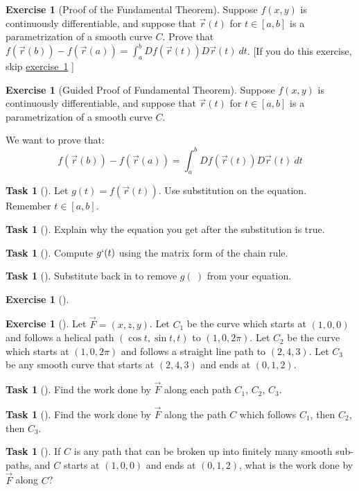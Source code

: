 \documentclass[10pt,]{book}
\theoremstyle{plain}
\theoremstyle{definition}
\theoremstyle{definition}
\theoremstyle{definition}
\theoremstyle{definition}
\newtheorem{exploration}[project]{Exercise}
\newtheorem{task}[project]{Task}
\theoremstyle{definition}
\numberwithin{equation}{section}
\begin{document}
\begin{exploration}[Proof of the Fundamental Theorem]\label{exploration-206}
Suppose \(f(x,y)\) is continuously differentiable, and suppose that \(\vec r(t)\) for \(t\in[a,b]\) is a parametrization of a smooth curve \(C\). Prove that \(f(\vec r(b))-f(\vec r(a)) = \int_a^b Df(\vec r(t))D\vec r(t)\ dt\). [If you do this exercise, skip \hyperref[prob_proof_of_fundamental_thm2]{exercise~\ref{prob_proof_of_fundamental_thm2}} ]%
\end{exploration}
\begin{exploration}[Guided Proof of Fundamental Theorem]\label{prob_proof_of_fundamental_thm2}
Suppose \(f(x,y)\) is continuously differentiable, and suppose that \(\vec r(t)\) for \(t\in[a,b]\) is a parametrization of a smooth curve \(C\).%
\par
We want to prove that:%
\begin{equation*}
f(\vec r(b))-f(\vec r(a)) = \int_a^b Df(\vec r(t))D\vec r(t)\ dt
\end{equation*}
%
\begin{task}[]\label{task-530}
Let \(g(t) = f(\vec r(t))\). Use substitution on the equation. Remember \(t \in [a,b]\).%
\end{task}
\begin{task}[]\label{task-531}
Explain why the equation you get after the substitution is true.%
\end{task}
\begin{task}[]\label{task-532}
Compute \(g`(t)\) using the matrix form of the chain rule.%
\end{task}
\begin{task}[]\label{task-533}
Substitute back in to remove \(g(\ )\) from your equation.%
\end{task}
\end{exploration}
\begin{exploration}[]\label{exploration-208}
\end{exploration}
\begin{exploration}[]\label{exploration-209}
Let \(\vec F = (x,z,y)\). Let \(C_1\) be the curve which starts at \((1,0,0)\) and follows a helical path \((\cos t, \sin t, t)\) to \((1,0,2\pi)\). Let \(C_2\) be the curve which starts at \((1,0, 2\pi)\) and follows a straight line path to \((2,4,3)\). Let \(C_3\) be any smooth curve that starts at \((2,4,3)\) and ends at \((0,1,2)\).%
\begin{task}[]\label{task-536}
Find the work done by \(\vec F\) along each path \(C_1\), \(C_2\), \(C_3\).  %
\end{task}
\begin{task}[]\label{task-537}
Find the work done by \(\vec F\) along the path \(C\) which follows \(C_1\), then \(C_2\), then \(C_3\).%
\end{task}
\begin{task}[]\label{task-538}
If \(C\) is any path that can be broken up into finitely many smooth sub-paths, and \(C\) starts at \((1,0,0)\) and ends at \((0,1,2)\), what is the work done by \(\vec F\) along \(C\)?%
\end{task}
\end{exploration}
\end{document}
